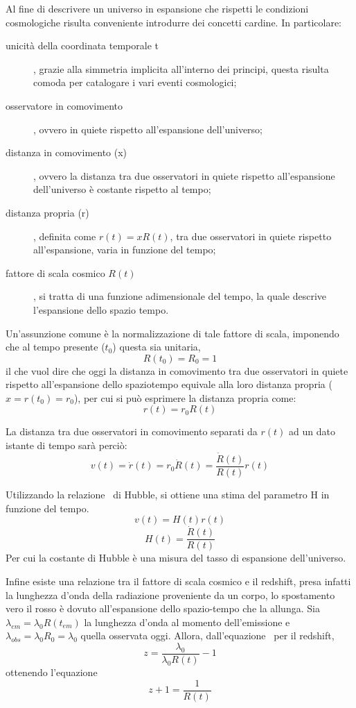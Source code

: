 Al fine di descrivere un universo in espansione che rispetti le condizioni cosmologiche risulta conveniente introdurre dei concetti cardine. In particolare:
\begin{description}
    \item[unicità della coordinata temporale t], grazie alla simmetria implicita all'interno dei principi, questa risulta comoda per catalogare i vari eventi cosmologici;
    \item[osservatore in comovimento], ovvero in quiete rispetto all'espansione dell'universo;
    \item[distanza in comovimento (x)], ovvero la distanza tra due osservatori in quiete rispetto all'espansione dell'universo è costante rispetto al tempo;
    \item[distanza propria (r)], definita come $r(t) = x R(t)$, tra due osservatori in quiete rispetto all'espansione, varia in funzione del tempo;
    \item[fattore di scala cosmico $R(t)$], si tratta di una funzione adimensionale del tempo, la quale descrive l'espansione dello spazio tempo.
\end{description}

Un'assunzione comune è la normalizzazione di tale fattore di scala, imponendo che al tempo presente ($t_0$) questa sia unitaria,
\[
    R(t_0) = R_0 = 1
\]
il che vuol dire che oggi la distanza in comovimento tra due osservatori in quiete rispetto all'espansione dello spaziotempo equivale alla loro distanza propria ($x = r(t_0) = r_0$), per cui si può esprimere la distanza propria come:
\[
    r(t)= r_0 R(t)
\]

La distanza tra due osservatori in comovimento separati da $r(t)$ ad un dato istante di tempo sarà perciò:
\begin{equation}\label{eq:hubble-speed}
    v(t) = \dot{r}(t) = r_0 \dot{R}(t) = \frac{\dot{R}(t)}{R(t)}r(t)
\end{equation}

Utilizzando la relazione~ di Hubble, si ottiene una stima del parametro H in funzione del tempo.
\[
    v(t) = H(t)r(t)
\]
\begin{equation}\label{eq:hubble-scale}
    H(t) = \frac{\dot{R}(t)}{R(t)}
\end{equation}
Per cui la costante di Hubble è una misura del tasso di espansione dell'universo.

Infine esiste una relazione tra il fattore di scala cosmico e il redshift, presa infatti la lunghezza d'onda della radiazione proveniente da un corpo, lo spostamento vero il rosso è dovuto all'espansione dello spazio-tempo che la allunga. Sia $\lambda_{em} = \lambda_0 R(t_{em})$ la lunghezza d'onda al momento dell'emissione e $\lambda_{obs} = \lambda_0 R_0 = \lambda_0$ quella osservata oggi. Allora, dall'equazione~ per il redshift,
\[
    z = \frac{\lambda_0}{\lambda_0 R(t)}-1
\]
ottenendo l'equazione~
\begin{equation}\label{eq:redshift-rescale}
    z + 1 = \frac{1}{R(t)} 
\end{equation}